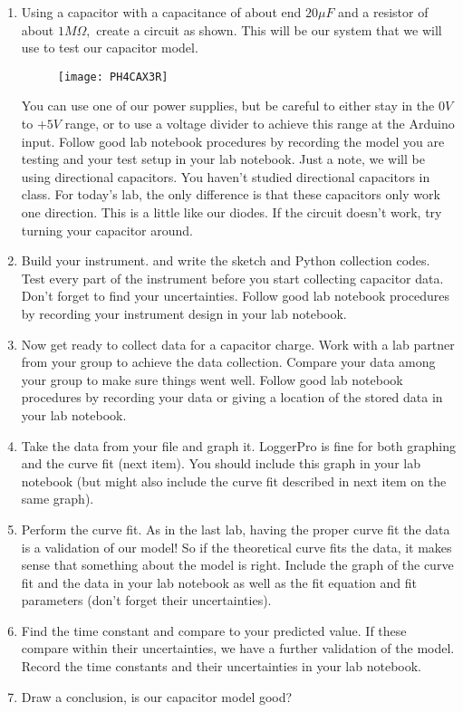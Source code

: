 \begin{enumerate}
	\item 	Using a capacitor with a capacitance of about end $20\unit{\mu F}$ and a resistor of about $1\unit{M\Omega},$ create a circuit as shown. This will be our system that we will use to test our capacitor model.
	
	\begin{figure}[h!]
		\centering
		\texttt{[image: PH4CAX3R]}
	\end{figure}

	You can use one of our power supplies, but be careful to either stay in the $0\unit{V}$ to $+5\unit{V}$ range, or to use a voltage divider to achieve this range at the Arduino input. Follow good lab notebook procedures by recording the model you are testing and your test setup in your lab notebook. Just a note, we will be using directional capacitors. You haven't studied directional capacitors in class. For today's lab, the only difference is that these capacitors only work one direction. This is a little like our diodes. If the circuit doesn't work, try turning your capacitor around.

	\item Build your instrument. and write the sketch and Python collection codes. Test every part of the instrument before you start collecting capacitor data. Don't forget to find your uncertainties. Follow good lab notebook procedures by recording your instrument design in your lab notebook.

	\item Now get ready to collect data for a capacitor charge. Work with a lab partner from your group to achieve the data collection. Compare your data among your group to make sure things went well. Follow good lab notebook procedures by recording your data or giving a location of the stored data in your lab notebook. 
	
	\item Take the data from your file and graph it. LoggerPro is fine for both graphing and the curve fit (next item). You should include this graph in your lab notebook (but might also include the curve fit described in  next item on the same graph).

	\item Perform the curve fit. As in the last lab, having the proper curve fit the data is a validation of our model! So if the theoretical curve fits the data, it makes sense that something about the model is right. Include the graph of the curve fit and the data in your lab notebook as well as the fit equation and fit parameters (don't forget their uncertainties).

	\item Find the time constant and compare to your predicted value. If these compare within their uncertainties, we have a further validation of the model. Record the time constants and their uncertainties in your lab notebook.

	\item Draw a conclusion, is our capacitor model good?
\end{enumerate}


\vspace*{\fill}
